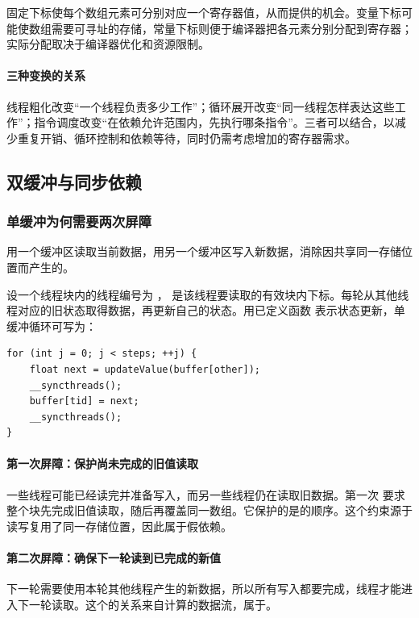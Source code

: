 固定下标使每个数组元素可分别对应一个寄存器值，从而提供的机会。变量下标可能使数组需要可寻址的存储，常量下标则便于编译器把各元素分别分配到寄存器；实际分配取决于编译器优化和资源限制。

\paragraph{三种变换的关系}
线程粗化改变“一个线程负责多少工作”；循环展开改变“同一线程怎样表达这些工作”；指令调度改变“在依赖允许范围内，先执行哪条指令”。三者可以结合，以减少重复开销、循环控制和依赖等待，同时仍需考虑增加的寄存器需求。

\subsection{双缓冲与同步依赖}
\subsubsection{单缓冲为何需要两次屏障}
用一个缓冲区读取当前数据，用另一个缓冲区写入新数据，消除因共享同一存储位置而产生的。

\par\noindent\begin{minipage}{\linewidth}
设一个线程块内的线程编号为 ， 是该线程要读取的有效块内下标。每轮从其他线程对应的旧状态取得数据，再更新自己的状态。用已定义函数  表示状态更新，单缓冲循环可写为：

\begin{lstlisting}[caption={单缓冲迭代：读完旧值后才能覆盖，写完新值后下一轮才能读取。}]
for (int j = 0; j < steps; ++j) {
    float next = updateValue(buffer[other]);
    __syncthreads();
    buffer[tid] = next;
    __syncthreads();
}
\end{lstlisting}
\end{minipage}\par

\paragraph{第一次屏障：保护尚未完成的旧值读取}
一些线程可能已经读完并准备写入，而另一些线程仍在读取旧数据。第一次  要求整个块先完成旧值读取，随后再覆盖同一数组。它保护的是的顺序。这个约束源于读写复用了同一存储位置，因此属于假依赖。

\paragraph{第二次屏障：确保下一轮读到已完成的新值}
下一轮需要使用本轮其他线程产生的新数据，所以所有写入都要完成，线程才能进入下一轮读取。这个的关系来自计算的数据流，属于。

